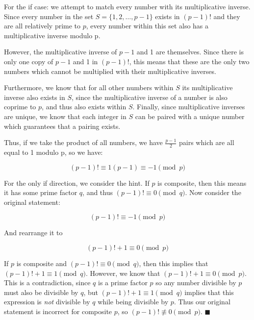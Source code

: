 \documentclass[11pt]{article}
\begin{document}
\begin{solution}
  For the if case: we attempt to match every number with its multiplicative inverse. Since every number in the set $S = \{1, 2, \dots, p-1\}$ exists in $(p - 1)!$ and they are all relatively prime to $p$, every number within this set also has a multiplicative inverse modulo p. 

  However, the multiplicative inverse of $p -1$ and 1 are themselves. Since there is only one copy of $p - 1$ and 1 in $(p - 1)!$, this means that these are the only two numbers which cannot be multiplied with their multiplicative inverses. 

  Furthermore, we know that for all other numbers within $S$ its multiplicative inverse also exists in $S$, since the multiplicative inverse of a number is also coprime to $p$, and thus also exists within $S$. Finally, since multiplicative inverses are unique, we know that each integer in $S$ can be paired with a unique number which guarantees that a pairing exists. 
  
  Thus, if we take the product of all numbers, we have $\frac{p- 1}{2}$ pairs which are all equal to 1 modulo p, so we have:

  \[ (p - 1)! \equiv 1(p - 1) \equiv -1 \pmod p\]


  
  For the only if direction, we consider the hint. If $p$ is composite, then this means it has some prime factor $q$, and thus $(p - 1)! \equiv 0 \pmod q$. Now consider the original statement:

  \[ (p - 1)! \equiv -1 \pmod p\]

  And rearrange it to 

  \[ (p - 1)! +1 \equiv 0 \pmod p\]

  If $p$ is composite and $(p - 1)! \equiv 0 \pmod q$, then this implies that $(p - 1)! +1 \equiv 1  \pmod q$. However, we know that $(p - 1)! + 1 \equiv 0 \pmod p$. This is a contradiction, since $q$ is a prime factor $p$ so any number divisible by $p$ must also be divisible by $q$, but $(p - 1)! +1 \equiv 1  \pmod q$ implies that this expression is \textit{not} divisible by $q$ while being divisible by $p$. Thus our original statement is incorrect for composite $p$, so $(p - 1)! \not \equiv 0 \pmod p$. $\blacksquare$
  
  


\end{solution}
\end{document}
